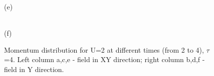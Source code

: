 \begin{figure}[h!]
\begin{minipage}[h]{0.43\linewidth}
\end{minipage}
\begin{minipage}[h]{0.43\linewidth}
 (e) \\
\end{minipage}
\hfill
\begin{minipage}[h]{0.43\linewidth}
 \\(f)
\end{minipage}
\caption{Momentum distribution for U=2 at different times (from 2 to 4), $\tau$=4. Left column a,c,e - field in XY direction; right column b,d,f - field in Y direction.}
\label{fig:md_u2_A_max}
\end{figure}


